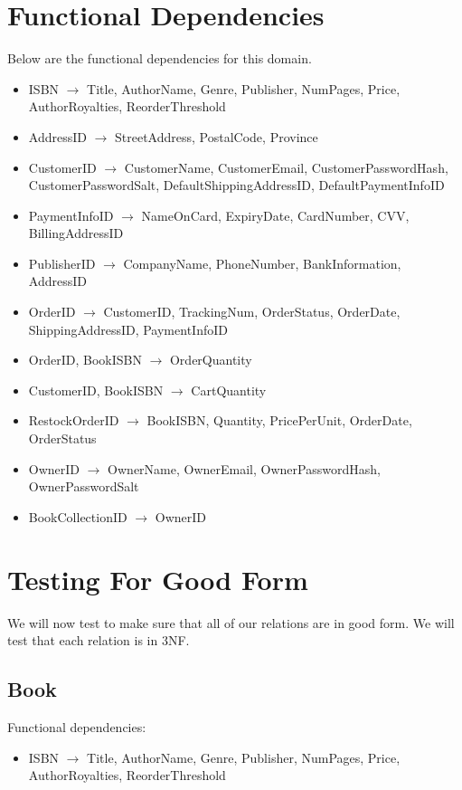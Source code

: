 \documentclass{article}
\newcommand{\trightarrow}{\(\rightarrow\)}
\begin{document}
\section{Functional Dependencies}
Below are the functional dependencies for this domain.
\begin{itemize}
  \item ISBN \trightarrow{} Title, AuthorName, Genre, Publisher, NumPages, Price, AuthorRoyalties, ReorderThreshold
  \item AddressID \trightarrow{} StreetAddress, PostalCode, Province
  \item CustomerID \trightarrow{} CustomerName, CustomerEmail, CustomerPasswordHash, CustomerPasswordSalt, DefaultShippingAddressID, DefaultPaymentInfoID
  \item PaymentInfoID \trightarrow{} NameOnCard, ExpiryDate, CardNumber, CVV, BillingAddressID
  \item PublisherID \trightarrow{} CompanyName, PhoneNumber, BankInformation, AddressID
  \item OrderID \trightarrow{} CustomerID, TrackingNum, OrderStatus, OrderDate, ShippingAddressID, PaymentInfoID
  \item OrderID, BookISBN \trightarrow{} OrderQuantity
  \item CustomerID, BookISBN \trightarrow{} CartQuantity
  \item RestockOrderID \trightarrow{} BookISBN, Quantity, PricePerUnit, OrderDate, OrderStatus
  \item OwnerID \trightarrow{} OwnerName, OwnerEmail, OwnerPasswordHash, OwnerPasswordSalt
  \item BookCollectionID \trightarrow{} OwnerID
\end{itemize}

\section{Testing For Good Form}
We will now test to make sure that all of our relations are in good form. We will test that each relation is in 3NF.
\subsection{Book}
Functional dependencies:
\begin{itemize}
  \item ISBN \trightarrow{} Title, AuthorName, Genre, Publisher, NumPages, Price, AuthorRoyalties, ReorderThreshold
\end{itemize}
\end{document}
